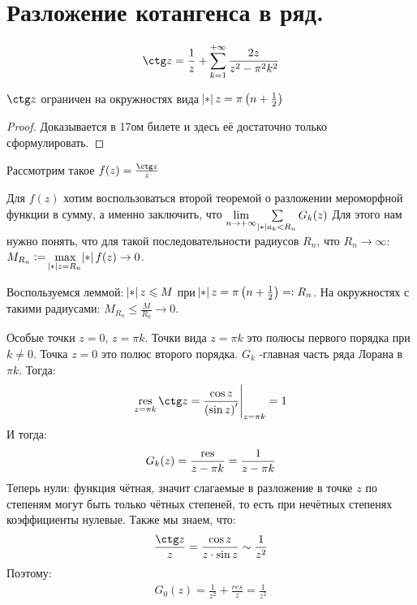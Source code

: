 \section{Разложение котангенса в ряд.}
\begin{example}
    \begin{gather*}
        \ctg z = \frac{1}{z} + \sum_{k=1}^{+\infty} \frac{2z}{z^2-\pi^2k^2}
    \end{gather*}
\end{example}

\begin{lemma}
    $\ctg z$ ограничен на окружностях вида $\abs{z} = \pi\left(n + \frac12\right)$
\end{lemma}

\begin{proof}

    Доказывается в 17ом билете и здесь её достаточно только сформулировать.
    
\end{proof}

Рассмотрим такое $f(z) = \frac{\ctg z}{z}$

Для $f(z)$ хотим воспользоваться второй теоремой о разложении мероморфной функции в сумму, а именно заключить, что $\lim\limits_{n \to +\infty} \sum\limits_{\abs{a_k} < R_n}^{} G_k(z)$
Для этого нам нужно понять, что для такой последовательности радиусов $R_n$, что $R_n \to \infty$: $M_{R_n} := \underset{\abs{z} = R_n}{\max} \abs{f(z)} \to 0$.

Воспользуемся леммой: $\abs{z} \le M$ при $\abs{z} = \pi\left(n + \frac12\right) =: R_n$. На окружностях с такими радиусами: $M_{R_n} \le \frac{M}{R_n} \to 0$.

Особые точки $z = 0$, $z = \pi k$. Точки вида $z = \pi k$ это полюсы первого порядка при $k \neq 0$. Точка $z = 0$ это полюс второго порядка. $G_k$ -главная часть ряда Лорана в $\pi k$. Тогда: 
\begin{gather*}
    \res\limits_{z=\pi k} \ctg z = \eval{\frac{\cos z}{\left( \sin z \right)'}}_{z=\pi k} = 1
\end{gather*}
И тогда:
\begin{gather*}
    G_k(z) = \frac{\operatorname*{res}}{z-\pi k} = \frac{1}{z-\pi k}
\end{gather*}
Теперь нули: функция чётная, значит слагаемые в разложение в точке $z$ по степеням могут быть только чётных степеней, то есть при нечётных степенях коэффициенты нулевые. Также мы знаем, что:
\begin{gather*}
    \frac{\ctg z}{z} = \frac{\cos z}{z \cdot \sin z} \sim \frac{1}{z^2}
\end{gather*} 
Поэтому: 
\begin{gather*}
    G_0(z) = \frac{1}{z^2} + \frac{res}{z}= \frac{1}{z^2}
\end{gather*}

